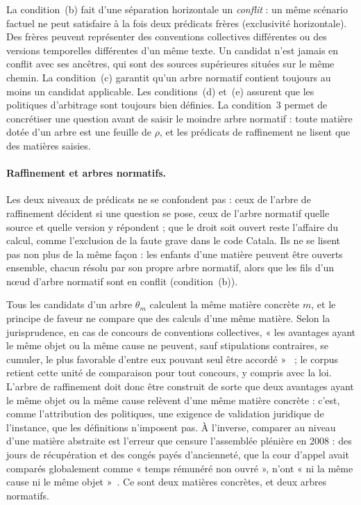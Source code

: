 \documentclass[review]{jflart}
\begin{document}
La condition~(b) fait d'une séparation horizontale un \emph{conflit} : un même
scénario factuel ne peut satisfaire à la fois deux prédicats frères
(exclusivité horizontale). Des frères peuvent représenter des conventions
collectives différentes ou des versions temporelles différentes d'un même
texte. Un candidat n'est jamais en conflit avec ses ancêtres, qui sont des
sources supérieures situées sur le même chemin. La condition~(c) garantit
qu'un arbre normatif contient toujours au moins un candidat applicable. Les conditions~(d) et~(e) assurent que les politiques
d'arbitrage sont toujours bien définies. La condition~3 permet de concrétiser
une question avant de saisir le moindre arbre normatif : toute matière dotée
d'un arbre est une feuille de \(\rho\), et les prédicats de raffinement ne
lisent que des matières saisies.

\paragraph{Raffinement et arbres normatifs.}
Les deux niveaux de prédicats ne se confondent pas : ceux de l'arbre de
raffinement décident si une question se pose, ceux de l'arbre normatif quelle
source et quelle version y répondent ; que le droit soit ouvert reste l'affaire
du calcul, comme l'exclusion de la faute grave dans le code Catala. Ils ne se
lisent pas non plus de la même façon : les enfants d'une matière peuvent être
ouverts ensemble, chacun résolu par son propre arbre normatif, alors que les
fils d'un nœud d'arbre normatif sont en conflit (condition~(b)).

\begin{remark}
Tous les candidats d'un arbre \(\theta_m\) calculent la même matière concrète
\(m\), et le principe de faveur ne compare que des calculs d'une même
matière. Selon la jurisprudence, en cas de concours de conventions
collectives, « les avantages ayant le même objet ou la même cause ne peuvent,
sauf stipulations contraires, se cumuler, le plus favorable d'entre eux pouvant
seul être accordé »~\cite{cassap1988} ; le corpus retient cette unité
de comparaison pour tout concours, y compris avec la loi. L'arbre de
raffinement doit donc être construit de sorte que deux avantages ayant le même
objet ou la même cause relèvent d'une même matière concrète : c'est, comme
l'attribution des politiques, une exigence de validation juridique de
l'instance, que les définitions n'imposent pas. À l'inverse, comparer au niveau
d'une matière abstraite est l'erreur que censure l'assemblée plénière en 2008 :
des jours de récupération et des congés payés d'ancienneté, que la cour d'appel
avait comparés globalement comme « temps rémunéré non ouvré », n'ont « ni la
même cause ni le même objet »~\cite{cassap2008}. Ce sont deux matières
concrètes, et deux arbres normatifs.
\end{remark}
\end{document}
